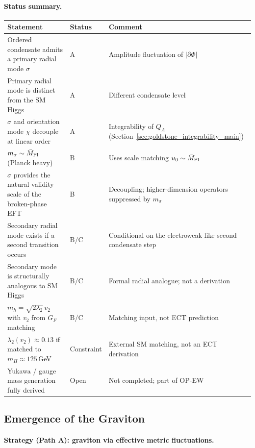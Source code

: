 \documentclass[11pt,a4paper]{article}
\numberwithin{equation}{section}
\begin{document}
\paragraph{Status summary.}
\begin{center}
\renewcommand{\arraystretch}{1.2}
\begin{tabular}{p{6.3cm}p{2.0cm}p{5.0cm}}
\hline
Statement & Status & Comment \\
\hline
Ordered condensate admits a primary radial mode $\sigma$
  & A & Amplitude fluctuation of $|\partial\Phi|$ \\
Primary radial mode is distinct from the SM Higgs
  & A & Different condensate level \\
$\sigma$ and orientation mode $\chi$ decouple at linear order
  & A & Integrability of $Q_A$ (Section~\ref{sec:goldstone_integrability_main}) \\
$m_\sigma\sim\bar{M}_{\rm Pl}$ (Planck heavy)
  & B & Uses scale matching $u_0\sim\bar{M}_{\rm Pl}$ \\
$\sigma$ provides the natural validity scale of the broken-phase EFT
  & B & Decoupling; higher-dimension operators suppressed by $m_\sigma$ \\
Secondary radial mode exists if a second transition occurs
  & B/C & Conditional on the electroweak-like second condensate step \\
Secondary mode is structurally analogous to SM Higgs
  & B/C & Formal radial analogue; not a derivation \\
$m_h = \sqrt{2\lambda_2}\,v_2$ with $v_2$ from $G_F$ matching
  & B/C & Matching input, not ECT prediction \\
$\lambda_2(v_2)\approx0.13$ if matched to $m_H\approx125$\,GeV
  & Constraint & External SM matching, not an ECT derivation \\
Yukawa / gauge mass generation fully derived
  & Open & Not completed; part of OP-EW \\
\hline
\end{tabular}
\end{center}

\subsection{Emergence of the Graviton}
\label{sec:graviton}

\paragraph{Strategy (Path A): graviton via effective metric fluctuations.}
\end{document}
